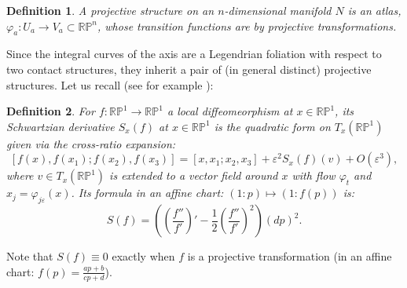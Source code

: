 \documentclass[10pt]{amsart}
\newcommand{\e}{\varepsilon}
\newcommand{\fe}{\varphi}
\theoremstyle{definition}
\newtheorem{dfn}{Definition}
\begin{document}
\begin{dfn}
    {\em A projective structure on an $n$-dimensional manifold $N$ is an atlas, $\fe_a : U_a \to V_a \subset \mathbb{RP}^n$, whose transition functions are by projective transformations.}
\end{dfn}

Since the integral curves of the axis are a Legendrian foliation with respect to two contact structures, they inherit a pair of (in general distinct) projective structures. Let us recall  (see for example \cite{TabOvSch}):

\begin{dfn}
   {\em  For $f:\mathbb{RP}^1\to \mathbb{RP}^1$ a local diffeomeorphism at $x\in \mathbb{RP}^1$, its {\em Schwartzian derivative} $S_x(f)$ at $x\in \mathbb{RP}^1$ is the quadratic form on $T_x(\mathbb{RP}^1)$ given via the cross-ratio expansion: 
    \[ [f(x), f(x_1); f(x_2), f(x_3)] = [x, x_1;x_2, x_3] + \e^2 S_x(f)(v) + O(\e^3),\] where $v \in T_x(\mathbb{RP}^1)$ is extended to a vector field around $x$ with flow $\fe_t$ and $x_j = \fe_{j\e}(x)$. Its formula in an affine chart: $(1:p) \mapsto (1: f(p))$ is:
    \[ S(f) = \left( \left( \frac{f''}{f'}\right)' - \frac12 \left( \frac{f''}{f'}\right)^2 \right) (dp)^2. \]}
\end{dfn}

Note that $S(f)\equiv 0$ exactly when $f$ is a projective transformation (in an affine chart: $f(p) = \frac{ap + b}{cp + d}$).
\end{document}
